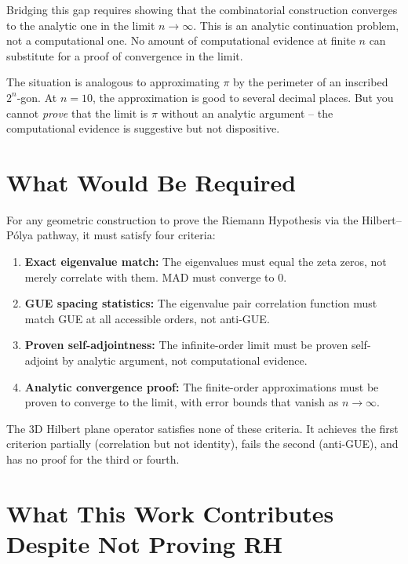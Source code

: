 \documentclass[11pt,a4paper]{article}
\begin{document}
Bridging this gap requires showing that the combinatorial construction
converges to the analytic one in the limit $n \to \infty$.  This is
an analytic continuation problem, not a computational one.  No amount
of computational evidence at finite $n$ can substitute for a proof of
convergence in the limit.

The situation is analogous to approximating $\pi$ by the perimeter of
an inscribed $2^n$-gon.  At $n=10$, the approximation is good to several
decimal places.  But you cannot \emph{prove} that the limit is $\pi$
without an analytic argument -- the computational evidence is suggestive
but not dispositive.

\section{What Would Be Required}

For any geometric construction to prove the Riemann Hypothesis via the
Hilbert--P\'{o}lya pathway, it must satisfy four criteria:

\begin{enumerate}
\item \textbf{Exact eigenvalue match:} The eigenvalues must equal the
   zeta zeros, not merely correlate with them.  MAD must converge to 0.

\item \textbf{GUE spacing statistics:} The eigenvalue pair correlation
   function must match GUE at all accessible orders, not anti-GUE.

\item \textbf{Proven self-adjointness:} The infinite-order limit must be
   proven self-adjoint by analytic argument, not computational evidence.

\item \textbf{Analytic convergence proof:} The finite-order approximations
   must be proven to converge to the limit, with error bounds that vanish
   as $n \to \infty$.
\end{enumerate}

The 3D Hilbert plane operator satisfies none of these criteria.  It
achieves the first criterion partially (correlation but not identity),
fails the second (anti-GUE), and has no proof for the third or fourth.

\section{What This Work Contributes Despite Not Proving RH}
\end{document}
